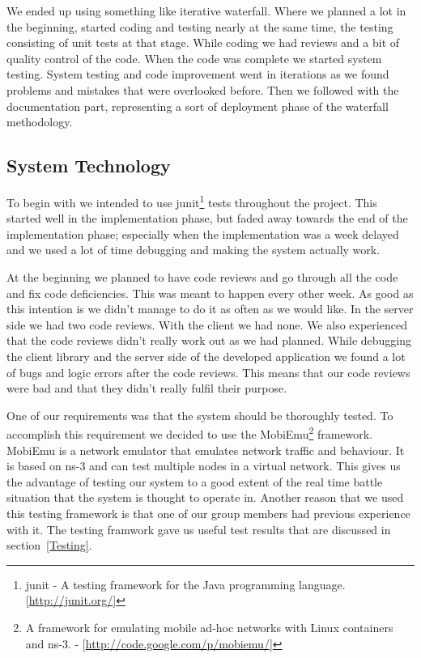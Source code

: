    We ended up using something like iterative waterfall. Where we planned a lot in the beginning, started coding and testing nearly at the same time, the testing consisting of unit tests at that stage. While coding we had reviews and a bit of quality control of the code. When the code was complete we started system testing. System testing and code improvement went in iterations as we found problems and mistakes that were overlooked before. Then we followed with the documentation part, representing a sort of deployment phase of the waterfall methodology. 

    \subsection{System Technology}\label{System Technology}
    
    To begin with we intended to use \gls{junit}\footnote{\gls{junit} - A testing framework for the Java programming language. [\url{http://junit.org/}]} tests throughout the project. This started well in the implementation phase, but faded away towards the end of the implementation phase; especially when the implementation was a week delayed and we used a lot of time debugging and making the system actually work. 
    
    At the beginning we planned to have code reviews and go through all the code and fix code deficiencies. This was meant to happen every other week. As good as this intention is we didn't manage to do it as often as we would like. In the server side we had two code reviews. With the client we had none. We also experienced that the code reviews didn't really work out as we had planned. While debugging the client library and the server side of the developed application we found a lot of bugs and logic errors after the code reviews. This means that our code reviews were bad and that they didn't really fulfil their purpose. 
    
    One of our requirements was that the system should be thoroughly tested. To accomplish this requirement we decided to use the MobiEmu\footnote{A framework for emulating mobile ad-hoc networks with Linux containers and ns-3. - [\url{http://code.google.com/p/mobiemu/}]} framework. MobiEmu is a network emulator that emulates network traffic and behaviour. It is based on ns-3 and can test multiple nodes in a virtual network. This gives us the advantage of testing our system to a good extent of the real time battle situation that the system is thought to operate in. Another reason that we used this testing framework is that one of our group members had previous experience with it. The testing framwork gave us useful test results that are discussed in section~\ref{Testing}.

